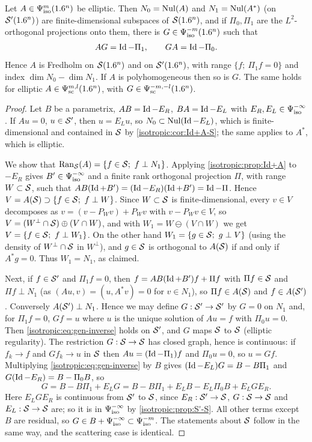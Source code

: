 \begin{proposition}\label{isotropic:prop:gen-inverse}
Let $A\in\Psi^{m}_{\mathrm{iso}}(1.6^n)$ be elliptic. Then $N_0=\operatorname{Nul}(A)$ and $N_1=\operatorname{Nul}(A^*)$
(on $\mathcal{S}'(1.6^n)$) are finite-dimensional subspaces of $\mathcal{S}(1.6^n)$, and if
$\Pi_0,\Pi_1$ are the $L^2$-orthogonal projections onto them, there is
$G\in\Psi^{-m}_{\mathrm{iso}}(1.6^n)$ such that
\begin{equation}\label{isotropic:eq:gen-inverse}
  AG=\operatorname{Id}-\Pi_1,\qquad GA=\operatorname{Id}-\Pi_0 .
\end{equation}
Hence $A$ is Fredholm on $\mathcal{S}(1.6^n)$ and on $\mathcal{S}'(1.6^n)$, with range
$\{f;\ \Pi_1f=0\}$ and index $\dim N_0-\dim N_1$. If $A$ is polyhomogeneous
then so is $G$. The same holds for elliptic $A\in\Psi^{m,l}_{\mathrm{sc}}(1.6^n)$, with
$G\in\Psi^{-m,-l}_{\mathrm{sc}}(1.6^n)$.
\end{proposition}
\begin{proof}
Let $B$ be a parametrix, $AB=\operatorname{Id}-E_R$, $BA=\operatorname{Id}-E_L$ with
$E_R,E_L\in\Psi^{-\infty}_{\mathrm{iso}}$. If $Au=0$, $u\in\mathcal{S}'$, then $u=E_Lu$, so
$N_0\subset\operatorname{Nul}(\operatorname{Id}-E_L)$, which is finite-dimensional and contained in $\mathcal{S}$
by \cref{isotropic:cor:Id+A-S}; the same applies to $A^*$, which is elliptic.

We show that $\Ran_{\cS}(A)=\{f\in\cS;\ f\perp N_1\}$. Applying
\cref{isotropic:prop:Id+A} to $-E_R$ gives $B'\in\Psi^{-\infty}_{\mathrm{iso}}$ and a finite
rank orthogonal projection $\Pi$, with range $W\subset\mathcal{S}$, such that
$AB(\operatorname{Id}+B')=(\operatorname{Id}-E_R)(\operatorname{Id}+B')=\operatorname{Id}-\Pi$. Hence
$V=A(\mathcal{S})\supset\{f\in\mathcal{S};\ f\perp W\}$. Since $W\subset\mathcal{S}$ is
finite-dimensional, every $v\in V$ decomposes as $v=(v-P_Wv)+P_Wv$ with
$v-P_Wv\in V$, so $V=(W^\perp\cap\mathcal{S})\oplus(V\cap W)$, and with
$W_1=W\ominus(V\cap W)$ we get $V=\{f\in\mathcal{S};\ f\perp W_1\}$. On the other hand
$W_1=\{g\in\mathcal{S};\ g\perp V\}$ (using the density of $W^\perp\cap\mathcal{S}$ in
$W^\perp$), and $g\in\mathcal{S}$ is orthogonal to $A(\mathcal{S})$ if and only if $A^*g=0$.
Thus $W_1=N_1$, as claimed.

Next, if $f\in\mathcal{S}'$ and $\Pi_1f=0$, then $f=AB(\operatorname{Id}+B')f+\Pi f$ with $\Pi f\in\mathcal{S}$
and $\Pi f\perp N_1$ (as $(Au,v)=(u,A^*v)=0$ for $v\in N_1$), so $\Pi f\in A(\mathcal{S})$
and $f\in A(\mathcal{S}')$. Conversely $A(\mathcal{S}')\perp N_1$. Hence we may define
$G:\mathcal{S}'\to\mathcal{S}'$ by $G=0$ on $N_1$ and, for $\Pi_1f=0$, $Gf=u$ where $u$ is
the unique solution of $Au=f$ with $\Pi_0u=0$. Then
\eqref{isotropic:eq:gen-inverse} holds on $\mathcal{S}'$, and $G$ maps $\mathcal{S}$ to $\mathcal{S}$
(elliptic regularity). The restriction $G:\mathcal{S}\to\mathcal{S}$ has closed graph, hence
is continuous: if $f_k\to f$ and $Gf_k\to u$ in $\mathcal{S}$ then $Au=(\operatorname{Id}-\Pi_1)f$
and $\Pi_0u=0$, so $u=Gf$. Multiplying \eqref{isotropic:eq:gen-inverse} by $B$
gives $(\operatorname{Id}-E_L)G=B-B\Pi_1$ and $G(\operatorname{Id}-E_R)=B-\Pi_0B$, so
\begin{equation*}
  G=B-B\Pi_1+E_LG=B-B\Pi_1+E_LB-E_L\Pi_0B+E_LGE_R .
\end{equation*}
Here $E_LGE_R$ is continuous from $\mathcal{S}'$ to $\mathcal{S}$, since $E_R:\mathcal{S}'\to\mathcal{S}$,
$G:\mathcal{S}\to\mathcal{S}$ and $E_L:\mathcal{S}\to\mathcal{S}$ are; so it is in $\Psi^{-\infty}_{\mathrm{iso}}$ by
\cref{isotropic:prop:S'-S}. All other terms except $B$ are residual, so
$G\in B+\Psi^{-\infty}_{\mathrm{iso}}\subset\Psi^{-m}_{\mathrm{iso}}$. The statements about $\mathcal{S}$ follow
in the same way, and the scattering case is identical.
\end{proof}

